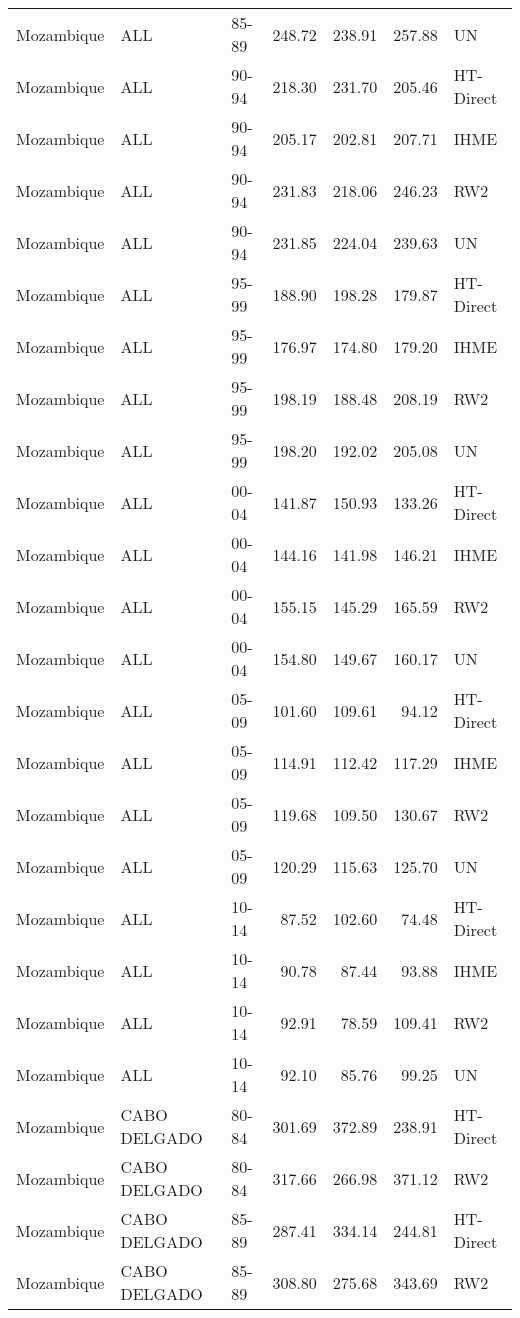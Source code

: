 \begin{longtable}{lllrrrl}
  Mozambique & ALL & 85-89 & 248.72 & 238.91 & 257.88 & UN \\ 
  Mozambique & ALL & 90-94 & 218.30 & 231.70 & 205.46 & HT-Direct \\ 
  Mozambique & ALL & 90-94 & 205.17 & 202.81 & 207.71 & IHME \\ 
  Mozambique & ALL & 90-94 & 231.83 & 218.06 & 246.23 & RW2 \\ 
  Mozambique & ALL & 90-94 & 231.85 & 224.04 & 239.63 & UN \\ 
  Mozambique & ALL & 95-99 & 188.90 & 198.28 & 179.87 & HT-Direct \\ 
  Mozambique & ALL & 95-99 & 176.97 & 174.80 & 179.20 & IHME \\ 
  Mozambique & ALL & 95-99 & 198.19 & 188.48 & 208.19 & RW2 \\ 
  Mozambique & ALL & 95-99 & 198.20 & 192.02 & 205.08 & UN \\ 
  Mozambique & ALL & 00-04 & 141.87 & 150.93 & 133.26 & HT-Direct \\ 
  Mozambique & ALL & 00-04 & 144.16 & 141.98 & 146.21 & IHME \\ 
  Mozambique & ALL & 00-04 & 155.15 & 145.29 & 165.59 & RW2 \\ 
  Mozambique & ALL & 00-04 & 154.80 & 149.67 & 160.17 & UN \\ 
  Mozambique & ALL & 05-09 & 101.60 & 109.61 & 94.12 & HT-Direct \\ 
  Mozambique & ALL & 05-09 & 114.91 & 112.42 & 117.29 & IHME \\ 
  Mozambique & ALL & 05-09 & 119.68 & 109.50 & 130.67 & RW2 \\ 
  Mozambique & ALL & 05-09 & 120.29 & 115.63 & 125.70 & UN \\ 
  Mozambique & ALL & 10-14 & 87.52 & 102.60 & 74.48 & HT-Direct \\ 
  Mozambique & ALL & 10-14 & 90.78 & 87.44 & 93.88 & IHME \\ 
  Mozambique & ALL & 10-14 & 92.91 & 78.59 & 109.41 & RW2 \\ 
  Mozambique & ALL & 10-14 & 92.10 & 85.76 & 99.25 & UN \\ 
  Mozambique & CABO DELGADO & 80-84 & 301.69 & 372.89 & 238.91 & HT-Direct \\ 
  Mozambique & CABO DELGADO & 80-84 & 317.66 & 266.98 & 371.12 & RW2 \\ 
  Mozambique & CABO DELGADO & 85-89 & 287.41 & 334.14 & 244.81 & HT-Direct \\ 
  Mozambique & CABO DELGADO & 85-89 & 308.80 & 275.68 & 343.69 & RW2 \\ 

\end{longtable}
